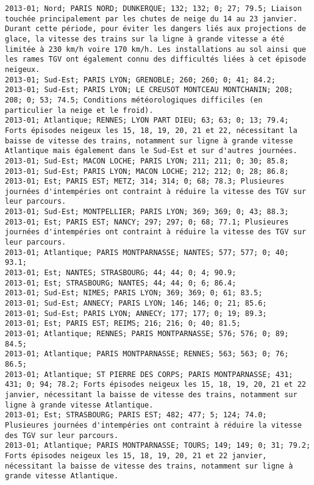 \documentclass{article}
\begin{document}
\begin{Verbatim}[commandchars=\\\{\}]
2013-01; Nord; PARIS NORD; DUNKERQUE; 132; 132; 0; 27; 79.5; Liaison touchée principalement par les chutes de neige du 14 au 23 janvier. Durant cette période, pour éviter les dangers liés aux projections de glace, la vitesse des trains sur la ligne à grande vitesse a été limitée à 230 km/h voire 170 km/h. Les installations au sol ainsi que les rames TGV ont également connu des difficultés liées à cet épisode neigeux.
2013-01; Sud-Est; PARIS LYON; GRENOBLE; 260; 260; 0; 41; 84.2; 
2013-01; Sud-Est; PARIS LYON; LE CREUSOT MONTCEAU MONTCHANIN; 208; 208; 0; 53; 74.5; Conditions météorologiques difficiles (en particulier la neige et le froid).
2013-01; Atlantique; RENNES; LYON PART DIEU; 63; 63; 0; 13; 79.4; Forts épisodes neigeux les 15, 18, 19, 20, 21 et 22, nécessitant la baisse de vitesse des trains, notamment sur ligne à grande vitesse Atlantique mais également dans le Sud-Est et sur d'autres journées.
2013-01; Sud-Est; MACON LOCHE; PARIS LYON; 211; 211; 0; 30; 85.8; 
2013-01; Sud-Est; PARIS LYON; MACON LOCHE; 212; 212; 0; 28; 86.8; 
2013-01; Est; PARIS EST; METZ; 314; 314; 0; 68; 78.3; Plusieures journées d'intempéries ont contraint à réduire la vitesse des TGV sur leur parcours.
2013-01; Sud-Est; MONTPELLIER; PARIS LYON; 369; 369; 0; 43; 88.3; 
2013-01; Est; PARIS EST; NANCY; 297; 297; 0; 68; 77.1; Plusieures journées d'intempéries ont contraint à réduire la vitesse des TGV sur leur parcours.
2013-01; Atlantique; PARIS MONTPARNASSE; NANTES; 577; 577; 0; 40; 93.1; 
2013-01; Est; NANTES; STRASBOURG; 44; 44; 0; 4; 90.9; 
2013-01; Est; STRASBOURG; NANTES; 44; 44; 0; 6; 86.4; 
2013-01; Sud-Est; NIMES; PARIS LYON; 369; 369; 0; 61; 83.5; 
2013-01; Sud-Est; ANNECY; PARIS LYON; 146; 146; 0; 21; 85.6; 
2013-01; Sud-Est; PARIS LYON; ANNECY; 177; 177; 0; 19; 89.3; 
2013-01; Est; PARIS EST; REIMS; 216; 216; 0; 40; 81.5; 
2013-01; Atlantique; RENNES; PARIS MONTPARNASSE; 576; 576; 0; 89; 84.5; 
2013-01; Atlantique; PARIS MONTPARNASSE; RENNES; 563; 563; 0; 76; 86.5; 
2013-01; Atlantique; ST PIERRE DES CORPS; PARIS MONTPARNASSE; 431; 431; 0; 94; 78.2; Forts épisodes neigeux les 15, 18, 19, 20, 21 et 22 janvier, nécessitant la baisse de vitesse des trains, notamment sur ligne à grande vitesse Atlantique.
2013-01; Est; STRASBOURG; PARIS EST; 482; 477; 5; 124; 74.0; Plusieures journées d'intempéries ont contraint à réduire la vitesse des TGV sur leur parcours.
2013-01; Atlantique; PARIS MONTPARNASSE; TOURS; 149; 149; 0; 31; 79.2; Forts épisodes neigeux les 15, 18, 19, 20, 21 et 22 janvier, nécessitant la baisse de vitesse des trains, notamment sur ligne à grande vitesse Atlantique.

\end{Verbatim}
\end{document}
